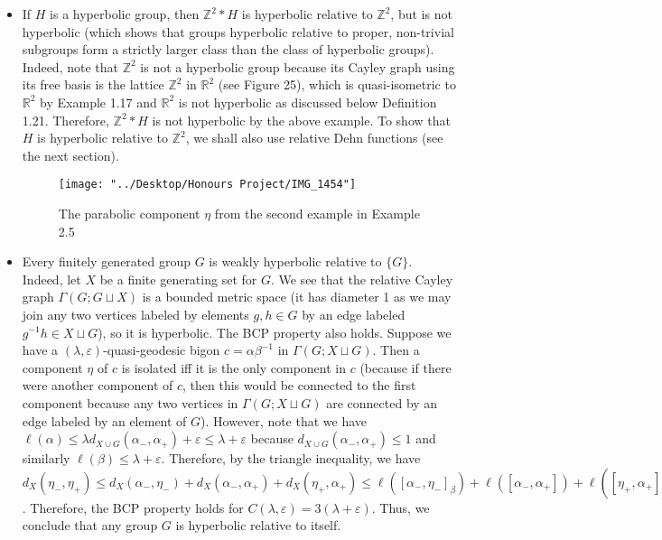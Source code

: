 \documentclass[12pt]{article}
\begin{document}
\begin{itemize}
		\item If $H$ is a hyperbolic group, then $\mathbb{Z}^2 * H$ is hyperbolic relative to $\mathbb{Z}^2$, but is not hyperbolic (which shows that groups hyperbolic relative to proper, non-trivial subgroups form a strictly larger class than the class of hyperbolic groups). Indeed, note that $\mathbb{Z}^2$ is not a hyperbolic group because its Cayley graph using its free basis is the lattice $\mathbb{Z}^2$ in $\mathbb{R}^2$ (see Figure 25), which is quasi-isometric to $\mathbb{R}^2$ by Example 1.17 and $\mathbb{R}^2$ is not hyperbolic as discussed below Definition 1.21. Therefore, $\mathbb{Z}^2 * H$ is not hyperbolic by the above example. To show that $H$ is hyperbolic relative to $\mathbb{Z}^2$, we shall also use relative Dehn functions (see the next section). 
		
\begin{figure} [H]
	\centering
	\texttt{[image: "../Desktop/Honours Project/IMG\_1454"]}
	\caption{The parabolic component $\eta$ from the second example in Example 2.5}
	\label{fig:img1454}
\end{figure}
		
		\item Every finitely generated group $G$ is weakly hyperbolic relative to $\{G\}$. Indeed, let $X$ be a finite generating set for $G$. We see that the relative Cayley graph $\Gamma(G; G \sqcup X)$ is a bounded metric space (it has diameter 1 as we may join any two vertices labeled by elements $g,h \in G$ by an edge labeled $g^{-1}h \in X \sqcup G$), so it is hyperbolic. The BCP property also holds. Suppose we have a $(\lambda, \varepsilon)$-quasi-geodesic bigon $c = \alpha \beta^{-1}$ in $\Gamma(G; X \sqcup G)$. Then a component $\eta$ of $c$ is isolated iff it is the only component in $c$ (because if there were another component of $c$, then this would be connected to the first component because any two vertices in $\Gamma(G; X \sqcup G)$ are connected by an edge labeled by an element of $G$). However, note that we have $\ell(\alpha) \leq \lambda d_{X \cup G}(\alpha_{-}, \alpha_{+}) + \varepsilon \leq \lambda + \varepsilon $ because $d_{X \cup G}(\alpha_{-}, \alpha_{+}) \leq 1$ and similarly $\ell(\beta) \leq \lambda + \varepsilon$. Therefore, by the triangle inequality, we have $d_X(\eta_-, \eta_+) \leq d_X(\alpha_-, \eta_-) + d_X(\alpha_-, \alpha_+) + d_X(\eta_+, \alpha_+) \leq \ell([\alpha_-, \eta_-]_{\beta}) + \ell([\alpha_-, \alpha_+]) + \ell([\eta_+, \alpha_+]_{\beta}) \leq 3(\lambda + \varepsilon)$. Therefore, the BCP property holds for $C(\lambda, \varepsilon) = 3(\lambda + \varepsilon)$. Thus, we conclude that any group $G$ is hyperbolic relative to itself. 
	\end{itemize}
\end{document}
